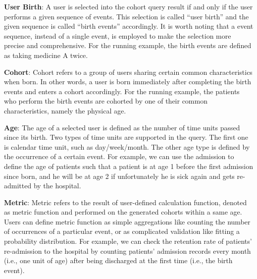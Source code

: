 \textbf{User Birth}: A user is selected into the cohort query result if and only if the user performs a given sequence of events. This selection is called ``user birth'' and the given sequence is called ``birth events'' accordingly. It is worth noting that a event sequence, instead of a single event, is employed to make the selection more precise and comprehensive.
For the running example, the birth events are defined as taking medicine A twice.

\textbf{Cohort}: Cohort refers to a group of users sharing certain common characteristics when born. In other words, a user is born immediately after completing the birth events and enters a cohort accordingly. For the running example, the patients who perform the birth events are cohorted by one of their common characteristics, namely the physical age.

\textbf{Age}: The age of a selected user is defined as the number of time units passed since its birth. Two types of time units are supported in the query. The first one is calendar time unit, such as day/week/month. 
The other age type is defined by the occurrence of a certain event. For example, we can use the admission to define the age of patients such that a patient is at age 1 before the first admission since born, and he will be at age 2 if unfortunately he is sick again and gets re-admitted by the hospital.


\textbf{Metric}: Metric refers to the result of user-defined calculation function, denoted as metric function and performed on the generated cohorts within a same age. Users can define metric function as simple aggregations like counting the number of occurrences of a particular event, or as complicated validation like fitting a probability distribution. For example, we can check the retention rate of patients' re-admission to the hospital by counting patients' admission records every month (i.e., one unit of age) after being discharged at the first time (i.e., the birth event).


